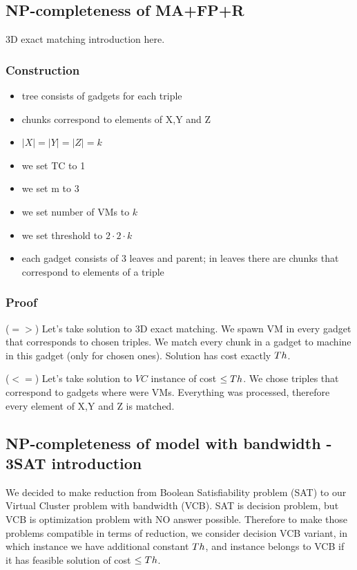 \subsection{NP-completeness of MA+FP+R}

3D exact matching introduction here.

\subsubsection{Construction}

\begin{itemize}
\item tree consists of gadgets for each triple
\item chunks correspond to elements of X,Y and Z
\item $|X| = |Y| = |Z| = k$
\item we set TC to 1
\item we set m to 3
\item we set number of VMs to $k$
\item we set threshold to $2 \cdot 2 \cdot k$
\item each gadget consists of 3 leaves and parent; in leaves there are
  chunks that correspond to elements of a triple
\end{itemize}

\subsubsection{Proof} 

($=>$) Let's take solution to 3D exact matching. We spawn VM in every
gadget that corresponds to chosen triples. We match every chunk in a
gadget to machine in this gadget (only for chosen ones). Solution has
cost exactly $Th$.

($<=$) Let's take solution to $VC$ instance of cost $\leq Th$. We
chose triples that correspond to gadgets where were VMs. Everything
was processed, therefore every element of X,Y and Z is matched.
\subsection{NP-completeness of model with bandwidth -
 3SAT introduction}

We decided to make reduction from Boolean Satisfiability problem (SAT)
to our Virtual Cluster problem with bandwidth (VCB). SAT is decision
problem, but VCB is optimization problem with NO answer
possible. Therefore to make those problems compatible in terms of
reduction, we consider decision VCB variant, in which instance we have
additional constant $Th$, and instance belongs to VCB if it has feasible
solution of cost $\leq Th$.

